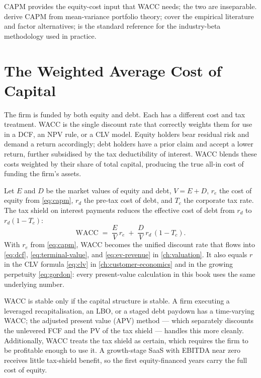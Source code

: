 CAPM provides the equity-cost input that WACC needs; the two are inseparable.
\textcite{brealey2020} derive CAPM from mean-variance portfolio theory;
\textcite{ross2022} cover the empirical literature and factor alternatives;
\textcite{berk6thcorporate} is the standard reference for the industry-beta
methodology used in practice.

\section{The Weighted Average Cost of Capital}\label{sec:wacc}

The firm is funded by both equity and debt. Each has a different cost and tax treatment.
WACC is the single discount rate that correctly weights them for use in a DCF, an NPV
rule, or a CLV model. Equity holders bear residual risk and demand a return accordingly;
debt holders have a prior claim and accept a lower return, further subsidised by the tax
deductibility of interest. WACC blends these costs weighted by their share of total capital,
producing the true all-in cost of funding the firm's assets.

Let \(E\) and \(D\) be the market values of equity and debt, \(V=E+D\), \(r_e\) the cost
of equity from \cref{eq:capm}, \(r_d\) the pre-tax cost of debt, and \(T_c\) the corporate
tax rate. The tax shield on interest payments reduces the effective cost of debt from
\(r_d\) to \(r_d(1-T_c)\):
\begin{equation}\label{eq:wacc}
  \mathrm{WACC} \;=\; \frac{E}{V}\,r_e \;+\; \frac{D}{V}\,r_d\,(1-T_c).
\end{equation}
With \(r_e\) from \cref{eq:capm}, WACC becomes the unified discount rate that flows into
\cref{eq:dcf}, \cref{eq:terminal-value}, and \cref{eq:ev-revenue} in \cref{ch:valuation}.
It also equals \(r\) in the CLV formula \cref{eq:clv} in \cref{ch:customer-economics} and
in the growing perpetuity \cref{eq:gordon}: every present-value calculation in this book
uses the same underlying number.

WACC is stable only if the capital structure is stable. A firm executing a leveraged
recapitalisation, an LBO, or a staged debt paydown has a time-varying WACC; the adjusted
present value (APV) method --- which separately discounts the unlevered FCF and the PV of
the tax shield --- handles this more cleanly. Additionally, WACC treats the tax shield as
certain, which requires the firm to be profitable enough to use it. A growth-stage SaaS
with EBITDA near zero receives little tax-shield benefit, so the first equity-financed years
carry the full cost of equity.


